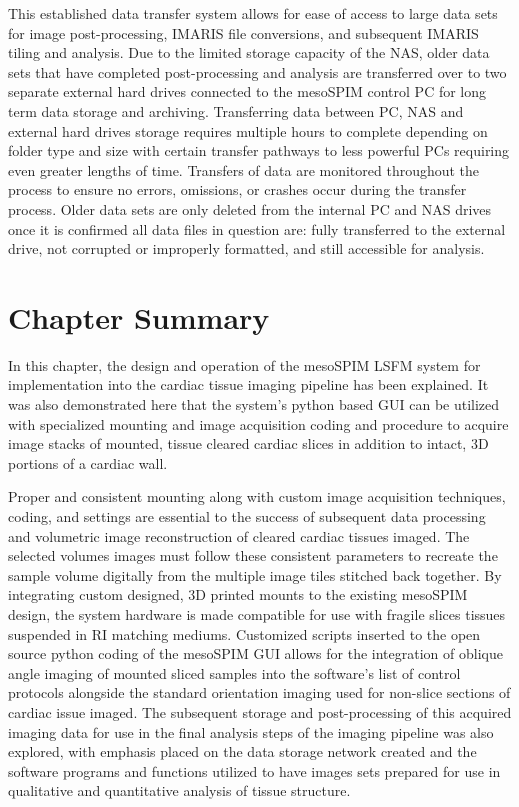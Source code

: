 This established data transfer system allows for ease of access to large data sets for image post-processing, IMARIS file conversions, and subsequent IMARIS tiling and analysis. Due to the limited storage capacity of the NAS, older data sets that have completed post-processing and analysis are transferred over to two separate external hard drives connected to the mesoSPIM control PC for long term data storage and archiving. Transferring data between PC, NAS and external hard drives storage requires multiple hours to complete depending on folder type and size with certain transfer pathways to less powerful PCs requiring even greater lengths of time. Transfers of data are monitored throughout the process to ensure no errors, omissions, or crashes occur during the transfer process. Older data sets are only deleted from the internal PC and NAS drives once it is confirmed all data files in question are: fully transferred to the external drive, not corrupted or improperly formatted, and still accessible for analysis. 

\section{Chapter Summary}
In this chapter, the design and operation of the mesoSPIM LSFM system for implementation into the cardiac tissue imaging pipeline has been explained. It was also demonstrated here that the system's python based GUI can be utilized with specialized mounting and image acquisition coding and procedure to acquire image stacks of mounted, tissue cleared cardiac slices in addition to intact, 3D portions of a cardiac wall. 

Proper and consistent mounting along with custom image acquisition techniques, coding, and settings are essential to the success of subsequent data processing and volumetric image reconstruction of cleared cardiac tissues imaged. The selected volumes images must follow these consistent parameters to recreate the sample volume digitally from the multiple image tiles stitched back together. By integrating custom designed, 3D printed mounts to the existing mesoSPIM design, the system hardware is made compatible for use with fragile slices tissues suspended in RI matching mediums. Customized scripts inserted to the open source python coding of the mesoSPIM GUI allows for the integration of oblique angle imaging of mounted sliced samples into the software's list of control protocols alongside the standard orientation imaging used for non-slice sections of cardiac issue imaged. The subsequent storage and post-processing of this acquired imaging data for use in the final analysis steps of the imaging pipeline was also explored, with emphasis placed on the data storage network created and the software programs and functions utilized to have images sets prepared for use in qualitative and quantitative analysis of tissue structure.

